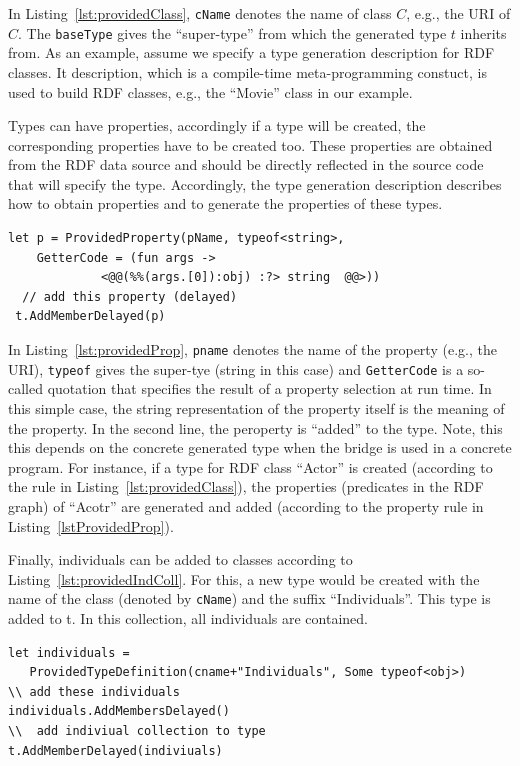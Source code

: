 \documentclass{llncs} %
\begin{document}
In Listing~\ref{lst:providedClass}, \texttt{cName} denotes the name of class $C$, e.g., the URI of $C$.
The \texttt{baseType} gives the ``super-type'' from which the generated type $t$ inherits from.
As an example, assume we specify a type generation description for RDF classes.
It description, which is a compile-time meta-programming constuct, is
used to build RDF classes, e.g., the ``Movie'' class in our example.


Types can have properties, accordingly if a type will be created, the corresponding properties
have to be created too. These properties are obtained from the RDF data source and should
be directly reflected in the source code that will specify the type.
Accordingly, the type generation description describes how to obtain properties and to
generate the properties of these types.

\begin{lstlisting}[style=code, caption={\texttt{Property Rule:} Add Property for Class C}, label={lst:providedProp}]
 let p = ProvidedProperty(pName, typeof<string>, 
    GetterCode = (fun args -> 
		     <@@(%%(args.[0]):obj) :?> string  @@>))
  // add this property (delayed)
 t.AddMemberDelayed(p)
 \end{lstlisting}

In Listing~\ref{lst:providedProp}, \texttt{pname} denotes the name of the property (e.g., the URI), \texttt{typeof} gives the
super-tye (string in this case) and \texttt{GetterCode} is a so-called quotation that specifies the result of a property selection at run time.
In this simple case, the string representation of the property itself is the meaning of the property.
In the second line, the peroperty is ``added'' to the type. Note, this this depends on the concrete generated type 
when the bridge is used in a concrete program. For instance, if a type for RDF class ``Actor'' is created (according to the rule in Listing~\ref{lst:providedClass}),
the properties (predicates in the RDF graph) of ``Acotr'' are generated and added (according to the property rule in Listing~\ref{lstProvidedProp}).

Finally, individuals can be added to classes according to Listing~\ref{lst:providedIndColl}.
For this, a new type would be created with the name of the class (denoted by \texttt{cName}) and the
suffix ``Individuals''. This type is added to t. In this collection, all individuals are contained.

\begin{lstlisting}[style=code, caption={\texttt{Individual Rule:} Add Individuals (set / collection) to Class C}, label={lst:providedIndColl}]
let individuals = 
   ProvidedTypeDefinition(cname+"Individuals", Some typeof<obj>)
\\ add these individuals
individuals.AddMembersDelayed()
\\  add indiviual collection to type 
t.AddMemberDelayed(indiviuals)
 \end{lstlisting}
\end{document}
